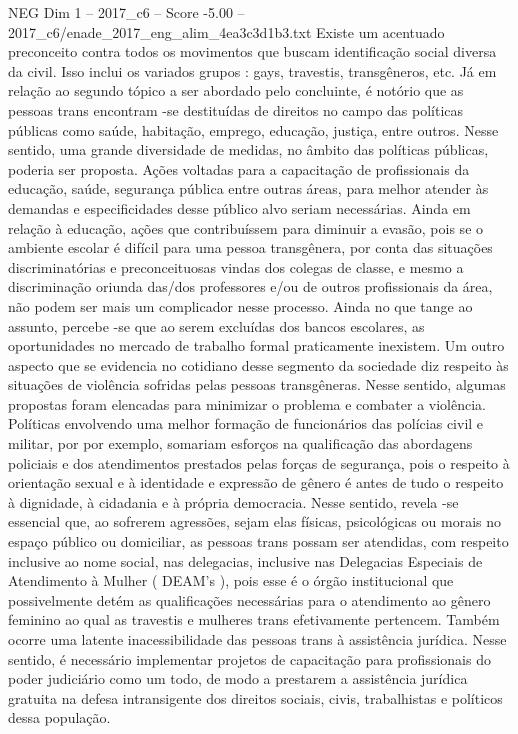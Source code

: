 \begin{textsample}{NEG Dim 1 – 2017\_c6 – Score -5.00 – 2017\_c6/enade\_2017\_eng\_alim\_4ea3c3d1b3.txt}
Existe um acentuado preconceito contra todos os movimentos que buscam identificação social diversa da civil.
Isso inclui os variados grupos : gays, travestis, transgêneros, etc.
Já em relação ao segundo tópico a ser abordado pelo concluinte, é notório que as pessoas trans encontram -se destituídas de direitos no campo das políticas públicas como saúde, habitação, emprego, educação, justiça, entre outros.
Nesse sentido, uma grande diversidade de medidas, no âmbito das políticas públicas, poderia ser proposta.
Ações voltadas para a capacitação de profissionais da educação, saúde, segurança pública entre outras áreas, para melhor atender às demandas e especificidades desse público alvo seriam necessárias.
Ainda em relação à educação, ações que contribuíssem para diminuir a evasão, pois se o ambiente escolar é difícil para uma pessoa transgênera, por conta das situações discriminatórias e preconceituosas vindas dos colegas de classe, e mesmo a discriminação oriunda das/dos professores e/ou de outros profissionais da área, não podem ser mais um complicador nesse processo.
Ainda no que tange ao assunto, percebe -se que ao serem excluídas dos bancos escolares, as oportunidades no mercado de trabalho formal praticamente inexistem.
Um outro aspecto que se evidencia no cotidiano desse segmento da sociedade diz respeito às situações de violência sofridas pelas pessoas transgêneras.
Nesse sentido, algumas propostas foram elencadas para minimizar o problema e combater a violência.
Políticas envolvendo uma melhor formação de funcionários das polícias civil e militar, por por exemplo, somariam esforços na qualificação das abordagens policiais e dos atendimentos prestados pelas forças de segurança, pois o respeito à orientação sexual e à identidade e expressão de gênero é antes de tudo o respeito à dignidade, à cidadania e à própria democracia.
Nesse sentido, revela -se essencial que, ao sofrerem agressões, sejam elas físicas, psicológicas ou morais no espaço público ou domiciliar, as pessoas trans possam ser atendidas, com respeito inclusive ao nome social, nas delegacias, inclusive nas Delegacias Especiais de Atendimento à Mulher ( DEAM’s ), pois esse é o órgão institucional que possivelmente detém as qualificações necessárias para o atendimento ao gênero feminino ao qual as travestis e mulheres trans efetivamente pertencem.
Também ocorre uma latente inacessibilidade das pessoas trans à assistência jurídica.
Nesse sentido, é necessário implementar projetos de capacitação para profissionais do poder judiciário como um todo, de modo a prestarem a assistência jurídica gratuita na defesa intransigente dos direitos sociais, civis, trabalhistas e políticos dessa população.

\end{textsample}
